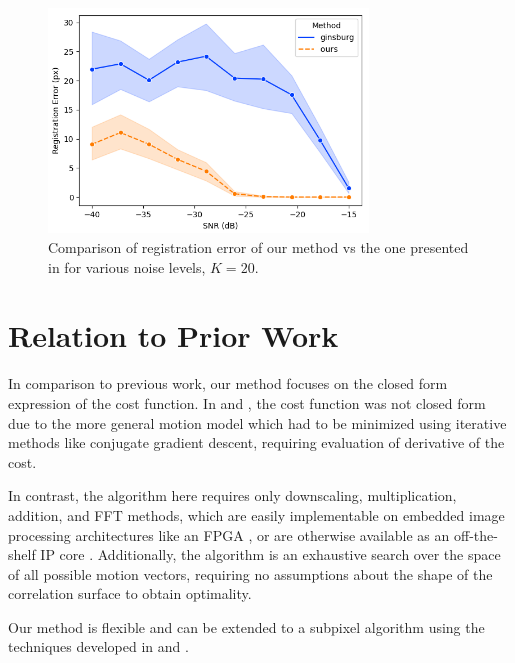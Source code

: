 \documentclass{article}
\begin{document}
\begin{figure}[htb]
  \begin{minipage}[b]{1\linewidth}
    \centering
    \centerline{\includegraphics[width=8.5cm]{images/method_compare.png}}
  \end{minipage}
  \caption{Comparison of registration error of our method vs the one presented in \cite{ginsburg2013bolocam} for various noise levels, $K=20$.}
  \label{fig:method_compare}
\end{figure}

\section{Relation to Prior Work}
\label{sec:prior}

In comparison to previous work, our method focuses on the closed form expression of the cost function.  In \cite{gratadour2005sub} and \cite{guillaume1998maximum}, the cost function was not closed form due to the more general motion model which had to be minimized using iterative methods like conjugate gradient descent, requiring evaluation of derivative of the cost.

In contrast, the algorithm here requires only downscaling, multiplication, addition, and FFT methods, which are easily implementable on embedded image processing architectures like an FPGA \cite{bailey2019image}, or are otherwise available as an off-the-shelf IP core \cite{xilinx}.  Additionally, the algorithm is an exhaustive search over the space of all possible motion vectors, requiring no assumptions about the shape of the correlation surface to obtain optimality.

Our method is flexible and can be extended to a subpixel algorithm using the techniques developed in \cite{guizar2008efficient} and \cite{gratadour2005sub}.

\end{document}
